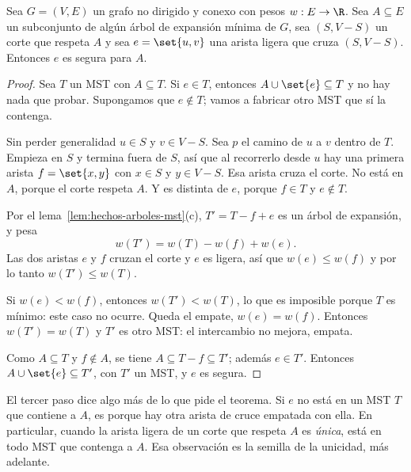 \documentclass[11pt,letterpaper]{article}
\begin{document}
\begin{teorema}
  \label{teo:propiedad-corte}
  Sea $G = (V, E)$ un grafo no dirigido y conexo con pesos
  $w : E \to \R$. Sea $A \subseteq E$ un subconjunto de algún árbol de
  expansión mínima de $G$, sea $(S, V - S)$ un corte que respeta $A$ y
  sea $e = \set{u, v}$ una arista ligera que cruza $(S, V - S)$.
  Entonces $e$ es segura para $A$.
\end{teorema}

\begin{proof}
  Sea $T$ un MST con $A \subseteq T$. Si $e \in T$, entonces
  $A \cup \set{e} \subseteq T$ y no hay nada que probar. Supongamos
  que $e \notin T$; vamos a fabricar otro MST que sí la contenga.

   Sin perder generalidad
  $u \in S$ y $v \in V - S$. Sea $p$ el camino de $u$ a $v$ dentro de
  $T$. Empieza en $S$ y termina fuera de $S$, así que al recorrerlo
  desde $u$ hay una primera arista $f = \set{x, y}$ con $x \in S$ y
  $y \in V - S$. Esa arista cruza el corte. No está en $A$, porque el
  corte respeta $A$. Y es distinta de $e$, porque $f \in T$ y
  $e \notin T$.

   Por el lema~\ref{lem:hechos-arboles-mst}(c),
  $T' = T - f + e$ es un árbol de expansión, y pesa
  \[
    w(T') = w(T) - w(f) + w(e) .
  \]
  Las dos aristas $e$ y $f$ cruzan el corte y $e$ es ligera, así que
  $w(e) \le w(f)$ y por lo tanto $w(T') \le w(T)$.

   Si $w(e) < w(f)$, entonces $w(T') < w(T)$, lo
  que es imposible porque $T$ es mínimo: este caso no ocurre. Queda
  el empate, $w(e) = w(f)$. Entonces $w(T') = w(T)$ y $T'$ es otro
  MST: el intercambio no mejora, empata.

   Como $A \subseteq T$ y
  $f \notin A$, se tiene $A \subseteq T - f \subseteq T'$; además
  $e \in T'$. Entonces $A \cup \set{e} \subseteq T'$, con $T'$ un MST,
  y $e$ es segura.
\end{proof}

El tercer paso dice algo más de lo que pide el teorema. Si $e$ no está
en un MST $T$ que contiene a $A$, es porque hay otra arista de cruce
empatada con ella. En particular, cuando la arista ligera de un corte
que respeta $A$ es \emph{única}, está en todo MST que contenga a $A$.
Esa observación es la semilla de la unicidad, más adelante.
\end{document}
